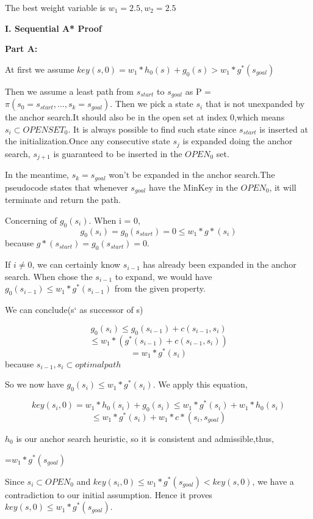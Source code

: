 \documentclass[12pt, letterpaper]{article}
\begin{document}
\noindent The best weight variable is $ w_1=2.5,w_2=2.5 $

\medskip



\pagebreak %

\noindent \textbf{I. Sequential A* Proof}

\noindent \textbf{Part A:}

\noindent At first we assume $ key(s,0)= w_1*h_0(s)+g_0(s) > w_1 * g^*(s_{goal}) $

\medskip

Then we assume a least path from $s_{start} $ to $s_{goal} $ as P = $ \pi(s_0=s_{start},...,s_k=s_{goal}) $. Then we pick a state $ s_i $ that is not unexpanded by the anchor search.It should also be in the open set at index 0,which means $ s_i \subset OPENSET_0 $.
It is always possible to find such state since $ s_{start} $ is inserted at the initialization.Once any consecutive state $ s_j $ is expanded doing the anchor search, $ s_{j+1} $ is guaranteed to be inserted in the $ OPEN_0 $ set. 

In the meantime, $ s_k=s_{goal} $ won't be expanded in the anchor search.The pseudocode states that whenever $ s_{goal} $ have the MinKey in the $ OPEN_0 $, it will terminate and return the path.

Concerning of $ g_0(s_i) $. When i = 0,
$$ g_0(s_i) = g_0(s_{start})=0 \leq w_1 * g*(s_i)$$
because $g*(s_{start})=g_0(s_{start})=0$.

If $i \neq 0$, we can certainly know $ s_{i-1} $ has already been expanded in the anchor search. When chose the $ s_{i-1} $ to expand, we would have $g_0(s_{i-1}) \leq w_1 * g^*(s_{i-1})$ from the given property.

We can conclude(s` as successor of s)

$$g_0(s_i) \leq g_0(s_{i-1})+ c(s_{i-1},s_i)$$
$$\leq w_1 * (g^*(s_{i-1})+ c(s_{i-1},s_i))$$
$$=w_1*g^*(s_i)$$
because $ s_{i-1},s_i \subset optimal path$

So we now have $g_0(s_i) \leq w_1*g^*(s_i)$. We apply this equation,

$$key(s_i,0)= w_1*h_0(s_i)+g_0(s_i) \leq w_1 * g^*(s_i) +  w_1 * h_0(s_i)$$
$$ \leq w_1 * g^*(s_i) +  w_1 *c*(s_i,s_{goal})$$

$h_0$ is our anchor search heuristic, so it is consistent and admissible,thus,

=$  w_1*g^*(s_{goal}) $

Since $ s_i \subset OPEN_0$ and $key(s_i,0) \leq w_1*g^*(s_{goal}) < key(s,0)$, we have a contradiction to our initial assumption. Hence it proves  $ key(s,0) \leq w_1 * g^*(s_{goal}) $.
\end{document}
